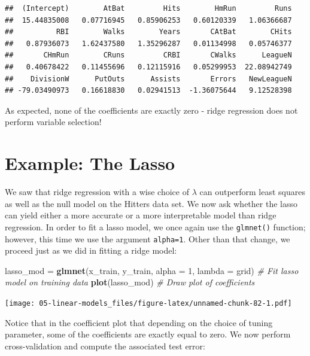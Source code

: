 \documentclass[openany]{book}
\newenvironment{Shaded}{\begin{snugshade}}{\end{snugshade}}
\newcommand{\CommentTok}[1]{\textcolor[rgb]{0.56,0.35,0.01}{\textit{#1}}}
\newcommand{\DataTypeTok}[1]{\textcolor[rgb]{0.13,0.29,0.53}{#1}}
\newcommand{\DecValTok}[1]{\textcolor[rgb]{0.00,0.00,0.81}{#1}}
\newcommand{\KeywordTok}[1]{\textcolor[rgb]{0.13,0.29,0.53}{\textbf{#1}}}
\newcommand{\NormalTok}[1]{#1}
\newcommand{\StringTok}[1]{\textcolor[rgb]{0.31,0.60,0.02}{#1}}
\begin{document}
\begin{verbatim}
##  (Intercept)        AtBat         Hits        HmRun         Runs 
##  15.44835008   0.07716945   0.85906253   0.60120339   1.06366687 
##          RBI        Walks        Years       CAtBat        CHits 
##   0.87936073   1.62437580   1.35296287   0.01134998   0.05746377 
##       CHmRun        CRuns         CRBI       CWalks      LeagueN 
##   0.40678422   0.11455696   0.12115916   0.05299953  22.08942749 
##    DivisionW      PutOuts      Assists       Errors   NewLeagueN 
## -79.03490973   0.16618830   0.02941513  -1.36075644   9.12528398
\end{verbatim}

As expected, none of the coefficients are exactly zero - ridge regression does not
perform variable selection!

\hypertarget{example-the-lasso}{%
\section{Example: The Lasso}\label{example-the-lasso}}

We saw that ridge regression with a wise choice of \(\lambda\) can outperform least
squares as well as the null model on the Hitters data set. We now ask
whether the lasso can yield either a more accurate or a more interpretable
model than ridge regression. In order to fit a lasso model, we once again
use the \texttt{glmnet()} function; however, this time we use the argument \texttt{alpha=1}.
Other than that change, we proceed just as we did in fitting a ridge model:

\begin{Shaded}
\begin{Highlighting}[]
\NormalTok{lasso_mod =}\StringTok{ }\KeywordTok{glmnet}\NormalTok{(x_train, y_train, }\DataTypeTok{alpha =} \DecValTok{1}\NormalTok{, }\DataTypeTok{lambda =}\NormalTok{ grid) }\CommentTok{# Fit lasso model on training data}
\KeywordTok{plot}\NormalTok{(lasso_mod)                                          }\CommentTok{# Draw plot of coefficients}
\end{Highlighting}
\end{Shaded}

\texttt{[image: 05-linear-models\_files/figure-latex/unnamed-chunk-82-1.pdf]}

Notice that in the coefficient plot that depending on the choice of tuning
parameter, some of the coefficients are exactly equal to zero. We now
perform cross-validation and compute the associated test error:
\end{document}
